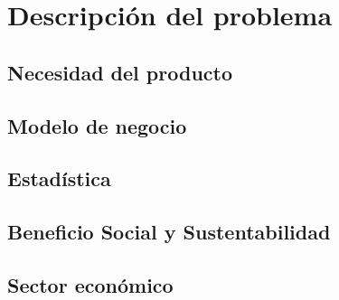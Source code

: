 
\section{Descripción del problema}

	\subsection{Necesidad del producto}

	\subsection{Modelo de negocio}

	\subsection{Estadística}

	\subsection{Beneficio Social y Sustentabilidad}

	\subsection{Sector económico}